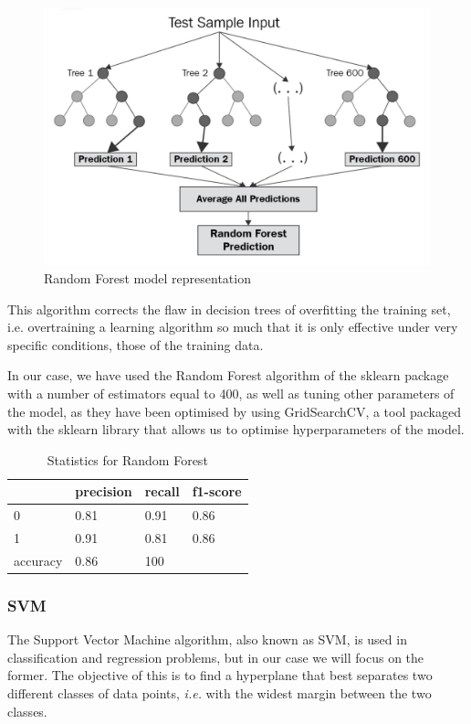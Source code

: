 \begin{figure}[!htp]
    \centering
    \includegraphics[scale=0.3]{img/detection/random-forest.jpg}
    \caption{Random Forest model representation}
    \label{fig:random-forest}
\end{figure}

This algorithm corrects the flaw in decision trees of overfitting the training set, i.e. overtraining a learning algorithm so much that it is only effective under very specific conditions, those of the training data.

In our case, we have used the Random Forest algorithm of the sklearn package with a number of estimators equal to 400, as well as tuning other parameters of the model, as they have been optimised by using GridSearchCV, a tool packaged with the sklearn library that allows us to optimise hyperparameters of the model.


\begin{table}[!htp]
\centering
\begin{tabular}{|l|l|l|l|}
\hline
         & precision & recall & f1-score \\ \hline
0        & 0.81      & 0.91   & 0.86     \\ \hline
1        & 0.91      & 0.81   & 0.86     \\ \hline
accuracy & 0.86      & 100    &          \\ \hline
\end{tabular}
\caption{Statistics for Random Forest}
\label{tab:RandomForestStatistics}
\end{table}

\subsubsection{SVM}
The Support Vector Machine algorithm, also known as SVM, is used in classification and regression problems, but in our case we will focus on the former. The objective of this is to find a hyperplane that best separates two different classes of data points,\textit{ i.e.} with the widest margin between the two classes. 

